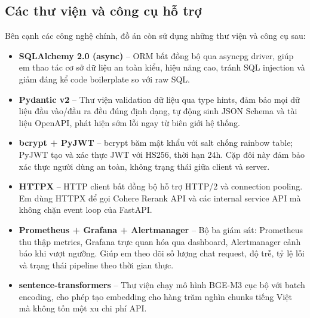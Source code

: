 \subsection{Các thư viện và công cụ hỗ trợ}

Bên cạnh các công nghệ chính, đồ án còn sử dụng những thư viện và công cụ sau:

\begin{itemize}
    \item \textbf{SQLAlchemy 2.0 (async)} -- ORM bất đồng bộ qua asyncpg driver, giúp em thao tác cơ sở dữ liệu an toàn kiểu, hiệu năng cao, tránh SQL injection và giảm đáng kể code boilerplate so với raw SQL.

    \item \textbf{Pydantic v2} -- Thư viện validation dữ liệu qua type hints, đảm bảo mọi dữ liệu đầu vào/đầu ra đều đúng định dạng, tự động sinh JSON Schema và tài liệu OpenAPI, phát hiện sớm lỗi ngay từ biên giới hệ thống.

    \item \textbf{bcrypt + PyJWT} -- bcrypt băm mật khẩu với salt chống rainbow table; PyJWT tạo và xác thực JWT với HS256, thời hạn 24h. Cặp đôi này đảm bảo xác thực người dùng an toàn, không trạng thái giữa client và server.

    \item \textbf{HTTPX} -- HTTP client bất đồng bộ hỗ trợ HTTP/2 và connection pooling. Em dùng HTTPX để gọi Cohere Rerank API và các internal service API mà không chặn event loop của FastAPI.

    \item \textbf{Prometheus + Grafana + Alertmanager} -- Bộ ba giám sát: Prometheus thu thập metrics, Grafana trực quan hóa qua dashboard, Alertmanager cảnh báo khi vượt ngưỡng. Giúp em theo dõi số lượng chat request, độ trễ, tỷ lệ lỗi và trạng thái pipeline theo thời gian thực.

    \item \textbf{sentence-transformers} -- Thư viện chạy mô hình BGE-M3 cục bộ với batch encoding, cho phép tạo embedding cho hàng trăm nghìn chunks tiếng Việt mà không tốn một xu chi phí API.
\end{itemize}

\newpage
